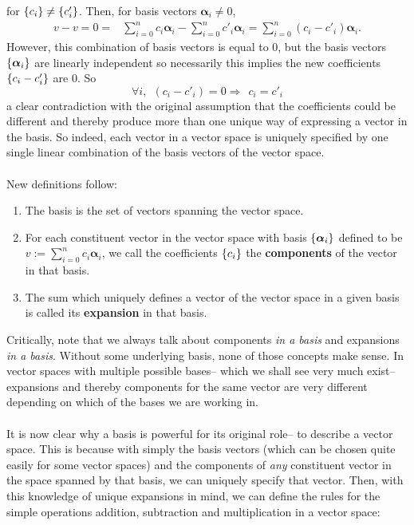 for $\{c_{i}\} \neq \{c'_{i}\}$. Then, for basis vectors $\bm{\alpha}_{i} \neq 0$,
$$
\begin{aligned}
v - v = 0= &\sum_{i=0}^{n}c_{i}\bm{\alpha}_{i}-\sum_{i=0}^{n}c'_{i}\bm{\alpha}_{i}=\sum_{i=0}^{n}(c_{i}-c'_{i})\bm{\alpha}_{i}.
\end{aligned}
$$
However, this combination of basis vectors is equal to ${0}$, but the basis vectors $\{\bm{\alpha}_{i}\}$ are linearly independent so necessarily this implies the new coefficients $\{c_{i}-c'_{i}\}$ are $0$. So
$$
\forall i, \:\: (c_{i}-c'_{i})=0 \Rightarrow\:\: c_{i} = c'_{i}
$$
a clear contradiction with the original assumption that the coefficients could be different and thereby produce more than one unique way of expressing a vector in the basis. So indeed, each vector in a vector space is uniquely specified by one single linear combination of the basis vectors of the vector space. 
\\\\
New definitions follow:
\begin{enumerate}
    \item The basis is the set of vectors spanning the vector space.
    \item For each constituent vector in the vector space with basis $\{\bm{\alpha}_{i}\}$ defined to be $v:=\sum_{i=0}^{n}c_{i}\bm{\alpha}_{i}$, we call the coefficients $\{c_{i}\}$ the \textbf{components} of the vector in that basis.
    \item The sum which uniquely defines a vector of the vector space in a given basis is called its \textbf{expansion} in that basis.
\end{enumerate}
Critically, note that we always talk about components \textit{in a basis} and expansions \textit{in a basis}. Without some underlying basis, none of those concepts make sense. In vector spaces with multiple possible bases-- which we shall see very much exist-- expansions and thereby components for the same vector are very different depending on which of the bases we are working in.
\\\\
It is now clear why a basis is powerful for its original role-- to describe a vector space. This is because with simply the basis vectors (which can be chosen quite easily for some vector spaces) and the components of \textit{any} constituent vector in the space spanned by that basis, we can uniquely specify that vector. Then, with this knowledge of unique expansions in mind, we can define the rules for the simple operations addition, subtraction and multiplication in a vector space:
